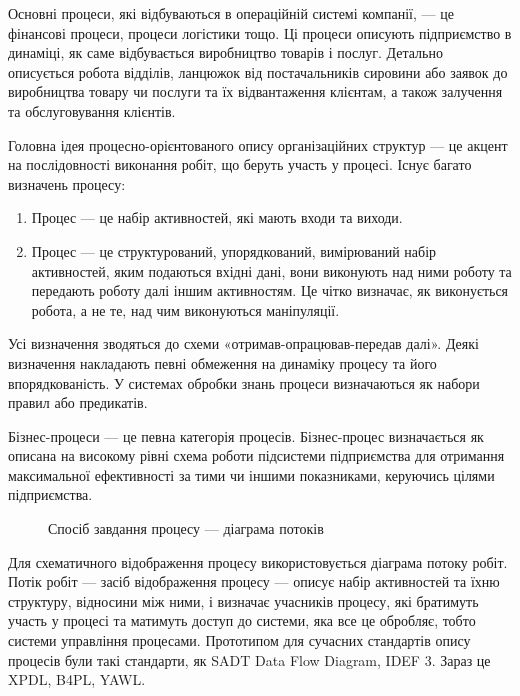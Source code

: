 \documentclass{memoir}
\begin{document}
Основні процеси, які відбуваються в операційній системі компанії, — це фінансові процеси, процеси логістики тощо. Ці процеси описують підприємство в динаміці, як саме відбувається виробництво товарів і послуг. Детально описується робота відділів, ланцюжок від постачальників сировини або заявок до виробництва товару чи послуги та їх відвантаження клієнтам, а також залучення та обслуговування клієнтів.

Головна ідея процесно-орієнтованого опису організаційних структур — це акцент на послідовності виконання робіт, що беруть участь у процесі. Існує багато визначень процесу:

\begin{enumerate}
    \item Процес — це набір активностей, які мають входи та виходи.
    \item Процес — це структурований, упорядкований, вимірюваний набір активностей, яким подаються вхідні дані, вони виконують над ними роботу та передають роботу далі іншим активностям. Це чітко визначає, як виконується робота, а не те, над чим виконуються маніпуляції.
\end{enumerate}

Усі визначення зводяться до схеми «отримав-опрацював-передав далі». Деякі визначення накладають певні обмеження на динаміку процесу та його впорядкованість. У системах обробки знань процеси визначаються як набори правил або предикатів.

Бізнес-процеси — це певна категорія процесів. Бізнес-процес визначається як описана на високому рівні схема роботи підсистеми підприємства для отримання максимальної ефективності за тими чи іншими показниками, керуючись цілями підприємства.

\begin{figure}[h]
    \centering
    \caption{Спосіб завдання процесу — діаграма потоків}
    \label{fig:flow_diagram}
\end{figure}

Для схематичного відображення процесу використовується діаграма потоку робіт. Потік робіт — засіб відображення процесу — описує набір активностей та їхню структуру, відносини між ними, і визначає учасників процесу, які братимуть участь у процесі та матимуть доступ до системи, яка все це обробляє, тобто системи управління процесами. Прототипом для сучасних стандартів опису процесів були такі стандарти, як SADT Data Flow Diagram, IDEF 3. Зараз це XPDL, B4PL, YAWL.
\end{document}
